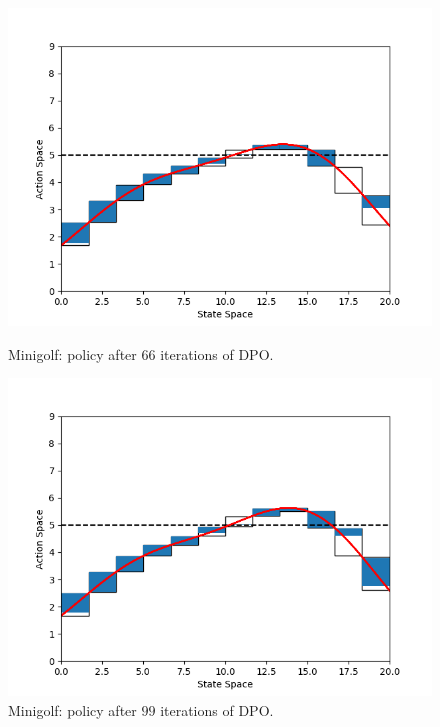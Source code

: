 \begin{figure}[h!]
	\centering
	\begin{minipage}[t]{.48\columnwidth}
		\includegraphics[width=\textwidth]{plots/it66.png}
		\caption{Minigolf: policy after $66$ iterations of \ac{DPO}.}
		\label{fig:mg66}
	\end{minipage}%
	\hfill
	\begin{minipage}[t]{.48\columnwidth}
		\includegraphics[width=\textwidth]{plots/it99.png}
		\caption{Minigolf: policy after $99$ iterations of \ac{DPO}.}
		\label{fig:mg99}
	\end{minipage}
\end{figure}
